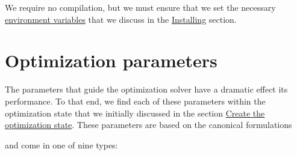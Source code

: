 \documentclass{report}
\newcommand{\secinstalling}{Installing}
\newcommand{\secstate}{Create the optimization state}
\newcommand{\chparams}{Optimization parameters}
\begin{document}
        We require no compilation, but we must ensure that we set the necessary \hyperref[itm:environmentvariables]{environment variables} that we discuss in the \hyperref[sec:installing]{\secinstalling} section.

\chapter{\chparams}\label{ch:params}
        
        The parameters that guide the optimization solver have a dramatic effect its performance.  To that end, we find each of these parameters within the optimization state that we initially discussed in the section \hyperref[sec:state]{\secstate}.  These parameters are based on the canonical formulations
\begin{center}
    \usebox{\boxOptimizationTypes}
\end{center}
\noindent and come in one of nine types:
\end{document}
